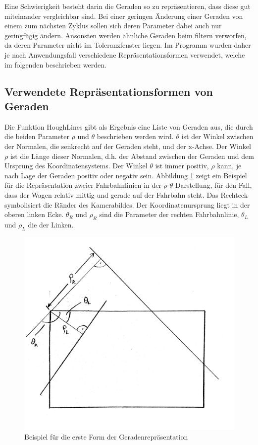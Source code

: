 	Eine Schwierigkeit besteht darin die Geraden so zu repräsentieren, dass diese gut miteinander vergleichbar sind. Bei einer geringen Änderung einer Geraden von einem zum nächsten Zyklus sollen sich deren Parameter dabei auch nur geringfügig ändern. Ansonsten werden ähnliche Geraden beim filtern verworfen, da deren Parameter nicht im Toleranzfenster liegen. Im Programm wurden daher je nach Anwendungsfall verschiedene Repräsentationsformen verwendet, welche im folgenden beschrieben werden.
	
	\subsection{Verwendete Repräsentationsformen von Geraden}
	
	Die Funktion HoughLines gibt als Ergebnis eine Liste von Geraden aus, die durch die beiden Parameter $\rho$ und $\theta$ beschrieben werden wird. $\theta$ ist der Winkel zwischen der Normalen, die senkrecht auf der Geraden steht, und der x-Achse. Der Winkel  $\rho$ ist die Länge dieser Normalen, d.h. der Abstand zwischen der Geraden und dem Ursprung des Koordinatensystems. Der Winkel $\theta$ ist immer positiv, $\rho$ kann, je nach Lage der Geraden positiv oder negativ sein.
	Abbildung \ref{fig:rho_theta1} zeigt ein Beispiel für die Repräsentation zweier Fahrbahnlinien in der $\rho$-$\theta$-Darstellung, für den Fall, dass der Wagen relativ mittig und gerade auf der Fahrbahn steht. Das Rechteck symbolisiert die Ränder des Kamerabildes. Der Koordinatenursprung liegt in der oberen linken Ecke. $\theta_R$ und $\rho_R$ sind die Parameter der rechten Fahrbahnlinie, $\theta_L$ und $\rho_L$ die der Linken.
	
	\begin{figure}[H]
		\centering
		\includegraphics[width=.5\linewidth]{images/rho_theta1.jpg}
		\caption{Beispiel für die erste Form der Geradenrepräsentation}
		\label{fig:rho_theta1}
	\end{figure}
	
